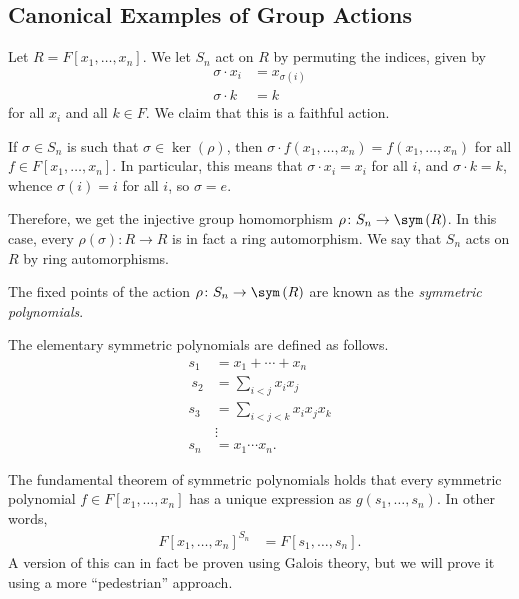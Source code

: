 \documentclass[10pt]{mypackage}
\begin{document}
\subsection{Canonical Examples of Group Actions}%
\begin{example}
  Let $R = F\left[ x_1,\dots,x_n \right]$. We let $S_n$ act on $R$ by permuting the indices, given by
  \begin{align*}
    \sigma\cdot x_i &= x_{\sigma(i)}\\
    \sigma\cdot k &= k
  \end{align*}
  for all $x_i$ and all $k\in F$. We claim that this is a faithful action.%

  If $\sigma\in S_n$ is such that $\sigma\in \ker\left( \rho \right)$, then $\sigma\cdot f\left( x_1,\dots,x_n \right) = f\left( x_1,\dots,x_n \right)$ for all $f\in F\left[ x_1,\dots,x_n \right]$. In particular, this means that $\sigma\cdot x_i = x_i$ for all $i$, and $\sigma\cdot k = k$, whence $\sigma\left( i \right) = i$ for all $i$, so $\sigma = e$.%

  Therefore, we get the injective group homomorphism $\rho\colon S_n\rightarrow \sym\left( R \right)$. In this case, every $\rho\left( \sigma \right)\colon R\rightarrow R$ is in fact a ring automorphism. We say that $S_n$ acts on $R$ by ring automorphisms.
  \begin{definition}
    The fixed points of the action $\rho\colon S_n\rightarrow \sym\left( R \right)$ are known as the \textit{symmetric polynomials}.
  \end{definition}
  \begin{definition}
    The elementary symmetric polynomials are defined as follows.
    \begin{align*}
      s_1 &= x_1 + \cdots + x_n\\\
      s_2 &= \sum_{i < j}x_ix_j\\
      s_3 &= \sum_{i<j<k}x_ix_jx_k\\
          &\vdots\\
      s_n &= x_1\cdots x_n.
    \end{align*}
  \end{definition}
  The fundamental theorem of symmetric polynomials holds that every symmetric polynomial $f\in F\left[ x_1,\dots,x_n \right]$ has a unique expression as $g\left( s_1,\dots,s_n \right)$. In other words,
  \begin{align*}
    F\left[ x_1,\dots,x_n \right]^{S_n} &= F\left[ s_1,\dots,s_n \right].
  \end{align*}
  A version of this can in fact be proven using Galois theory, but we will prove it using a more ``pedestrian'' approach.%


\end{example}
\end{document}
